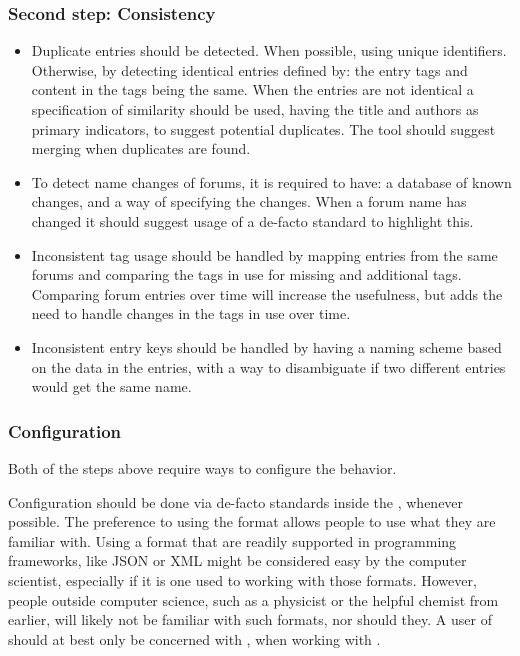 \subsubsection{Second step: Consistency}
\begin{itemize}
\item Duplicate entries should be detected.  When possible, using
  unique identifiers.  Otherwise, by detecting identical entries
  defined by: the entry tags and content in the tags being the same.
  When the entries are not identical a specification of similarity
  should be used, having the title and authors as primary indicators,
  to suggest potential duplicates.  The tool should suggest merging
  when duplicates are found.

\item To detect name changes of forums, it is required to have: a
  database of known changes, and a way of specifying the changes.
  When a forum name has changed it should suggest usage of a de-facto
  standard to highlight this.

\item Inconsistent tag usage should be handled by mapping entries from
  the same forums and comparing the tags in use for missing and
  additional tags.  Comparing forum entries over time will increase
  the usefulness, but adds the need to handle changes in the tags in
  use over time.

\item Inconsistent entry keys should be handled by having a naming
  scheme based on the data in the entries, with a way to disambiguate
  if two different entries would get the same name.
\end{itemize}


\subsubsection{Configuration}

Both of the steps above require ways to configure the behavior.

Configuration should be done via de-facto standards inside the
, whenever possible.  The preference to using the {\bibtex}
format allows people to use what they are familiar with.  Using a
format that are readily supported in programming frameworks, like JSON
or XML might be considered easy by the computer scientist, especially
if it is one used to working with those formats.  However, people
outside computer science, such as a physicist or the helpful chemist
from earlier, will likely not be familiar with such formats, nor
should they.  A user of {\bibtex} should at best only be concerned
with {\bibtex}, when working with {\bibtex}.

